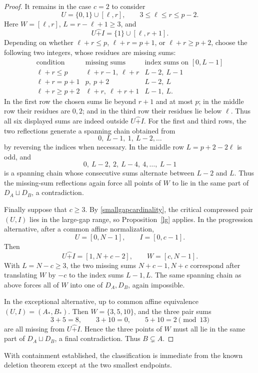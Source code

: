 \documentclass[10pt,a4paper]{amsart}
\newcommand{\rs}{\mathbin{\widehat+}}
\begin{document}
\begin{proof}
It remains in the case $c=2$ to consider
\[
 U=\{0,1\}\cup[\ell,r],
 \qquad 3\le\ell\le r\le p-2.
\]
Here $W=[\ell,r]$, $L=r-\ell+1\ge3$, and
\[
 U\rs I=\{1\}\cup[\ell,r+1].
\]
Depending on whether $\ell+r\le p$, $\ell+r=p+1$, or
$\ell+r\ge p+2$, choose the following two integers, whose residues
are missing sums:
\[
\begin{array}{c|c|c}
\text{condition}&\text{missing sums}&\text{index sums on }[0,L-1]\\ \hline
\ell+r\le p&\ell+r-1,\ \ell+r&L-2,\ L-1\\
\ell+r=p+1&p,\ p+2&L-2,\ L\\
\ell+r\ge p+2&\ell+r,\ \ell+r+1&L-1,\ L.
\end{array}
\]
In the first row the chosen sums lie beyond $r+1$ and at most $p$; in
the middle row their residues are $0,2$; and in the third row their
residues lie below $\ell$.  Thus all six displayed sums are indeed
outside $U\rs I$.  For the first and third rows, the two reflections
generate a spanning chain obtained from
\[
 0,\ L-1,\ 1,\ L-2,\ldots
\]
by reversing the indices when necessary.  In the middle row
$L=p+2-2\ell$ is odd, and
\[
 0,\ L-2,\ 2,\ L-4,\ 4,\ldots,\ L-1
\]
is a spanning chain whose consecutive sums alternate between $L-2$ and
$L$.  Thus the missing-sum reflections again force all points of $W$ to
lie in the same part of $D_A\sqcup D_B$, a contradiction.

Finally suppose that $c\ge3$.  By \eqref{smallgapcardinality}, the
critical compressed pair $(U,I)$ lies in the large-gap range, so
Proposition~\ref{lg} applies.  In the progression alternative, after a
common affine normalization,
\[
 U=[0,N-1],\qquad I=[0,c-1].
\]
Then
\[
 U\rs I=[1,N+c-2],\qquad W=[c,N-1].
\]
With $L=N-c\ge3$, the two missing sums $N+c-1,N+c$ correspond after
translating $W$ by $-c$ to the index sums $L-1,L$.  The same spanning
chain as above forces all of $W$ into one of $D_A,D_B$, again impossible.

In the exceptional alternative, up to common affine equivalence
$(U,I)=(A_*,B_*)$.  Then $W=\{3,5,10\}$, and the three pair sums
\[
 3+5=8,\qquad 3+10=0,\qquad 5+10=2\pmod{13}
\]
are all missing from $U\rs I$.  Hence the three points of $W$ must all
lie in the same part of $D_A\sqcup D_B$, a final contradiction.
Thus $B\subsetneq A$.
\end{proof}

With containment established, the classification is immediate from the
known deletion theorem except at the two smallest endpoints.
\end{document}
